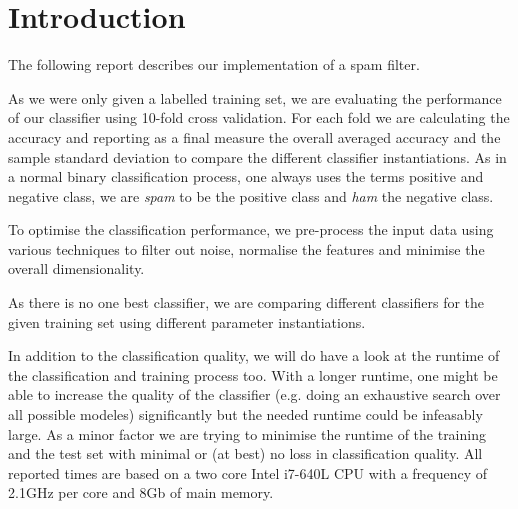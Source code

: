 \section{Introduction}
The following report describes our implementation of a spam filter.

As we were only given a labelled training set, we are evaluating the performance of our classifier using 10-fold cross validation.
For each fold we are calculating the accuracy and reporting as a final measure the overall averaged accuracy and the sample standard deviation to compare the different classifier instantiations.
As in a normal binary classification process, one always uses the terms positive and negative class, we are  \emph{spam} to be the positive class and \emph{ham} the negative class.

To optimise the classification performance, we pre-process the input data using various techniques to filter out noise, normalise the features and minimise the overall dimensionality.

As there is no one best classifier, we are comparing different classifiers for the given training set using different parameter instantiations.

In addition to the classification quality, we will do have a look at the runtime of the classification and training process too.
With a longer runtime, one might be able to increase the quality of the classifier (e.g. doing an exhaustive search over all possible modeles) significantly but the needed runtime could be infeasably large.
As a minor factor we are trying to minimise the runtime of the training and the test set with minimal or (at best) no loss in classification quality.
All reported times are based on a two core Intel i7-640L CPU with a frequency of 2.1GHz per core and 8Gb of main memory.

